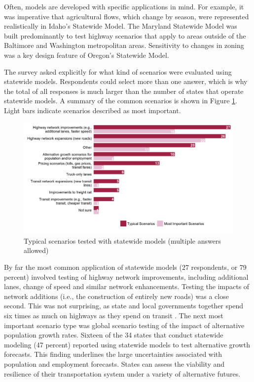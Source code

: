 Often, models are developed with specific applications in mind. For example, it was imperative that agricultural flows, which change by season, were represented realistically in Idaho's Statewide Model. The Maryland Statewide Model was built predominantly to test highway scenarios that apply to areas outside of the Baltimore and Washington metropolitan areas. Sensitivity to changes in zoning was a key design feature of Oregon's Statewide Model.

The survey asked explicitly for what kind of scenarios were evaluated using statewide models. Respondents could select more than one answer, which is why the total of all responses is much larger than the number of states that operate statewide models. A summary of the common scenarios is shown in Figure \ref{fig:typical-scenarios}. Light bars indicate scenarios described as most important.

\begin{figure}  %
\centering
\includegraphics[width=6in]{graphics/04-typical-scenarios-tested}
\caption[Typical scenarios tested with statewide models]{Typical scenarios tested with statewide models (multiple answers allowed)}
\label{fig:typical-scenarios}
\end{figure}

By far the most common application of statewide models (27 respondents, or 79 percent) involved testing of highway network improvements, including additional lanes, change of speed and similar network enhancements. Testing the impacts of network additions (i.e., the construction of entirely new roads) was a close second. This was not surprising, as state and local governments together spend six times as much on highways as they spend on transit \citep{usdot14}. The next most important scenario type was global scenario testing of the impact of alternative population growth rates. Sixteen of the 34 states that conduct statewide modeling (47 percent) reported using statewide models to test alternative growth forecasts. This finding underlines the large uncertainties associated with population and employment forecasts. States can assess the viability and resilience of their transportation system under a variety of alternative futures.


